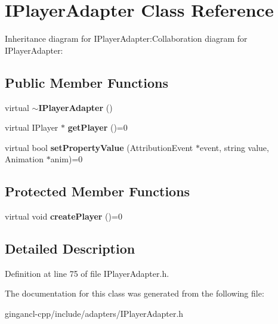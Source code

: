 \section{IPlayerAdapter Class Reference}
\label{classbr_1_1pucrio_1_1telemidia_1_1ginga_1_1ncl_1_1adapters_1_1IPlayerAdapter}
Inheritance diagram for IPlayerAdapter:Collaboration diagram for IPlayerAdapter:\subsection*{Public Member Functions}
\begin{CompactItemize}
\item 
virtual {\bf $\sim$IPlayerAdapter} ()\label{classbr_1_1pucrio_1_1telemidia_1_1ginga_1_1ncl_1_1adapters_1_1IPlayerAdapter_28cb53b12d77ad51f0ec0a2769e65735}

\item 
virtual IPlayer $\ast$ \textbf{getPlayer} ()=0\label{classbr_1_1pucrio_1_1telemidia_1_1ginga_1_1ncl_1_1adapters_1_1IPlayerAdapter_31d9d5daba2ff6154809de68647e64c7}

\item 
virtual bool \textbf{setPropertyValue} (AttributionEvent $\ast$event, string value, Animation $\ast$anim)=0\label{classbr_1_1pucrio_1_1telemidia_1_1ginga_1_1ncl_1_1adapters_1_1IPlayerAdapter_d4cacfa60bc8f0b4335f5a828bea8f02}

\end{CompactItemize}
\subsection*{Protected Member Functions}
\begin{CompactItemize}
\item 
virtual void \textbf{createPlayer} ()=0\label{classbr_1_1pucrio_1_1telemidia_1_1ginga_1_1ncl_1_1adapters_1_1IPlayerAdapter_17510d78e9131319546bde53a79f5b71}

\end{CompactItemize}


\subsection{Detailed Description}




Definition at line 75 of file IPlayerAdapter.h.

The documentation for this class was generated from the following file:\begin{CompactItemize}
\item 
gingancl-cpp/include/adapters/IPlayerAdapter.h\end{CompactItemize}
